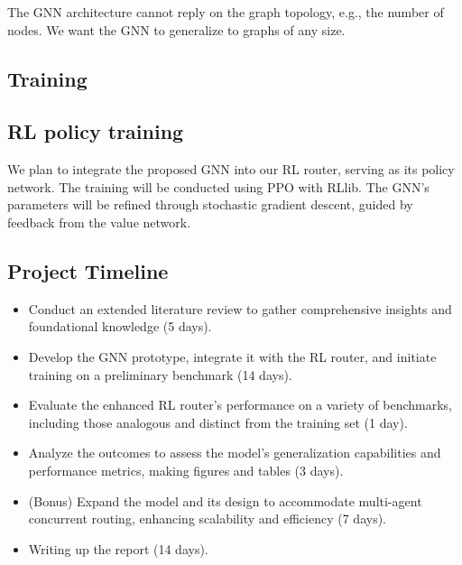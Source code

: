 \documentclass[letterpaper]{article}
\begin{document}
The GNN architecture cannot reply on the graph topology, e.g., the number of nodes. We want the GNN to generalize to graphs of any size. 
\subsection{Training}


\subsection{RL policy training}
We plan to integrate the proposed GNN into our RL router, serving as its policy network. The training will be conducted using PPO with RLlib. The GNN's parameters will be refined through stochastic gradient descent, guided by feedback from the value network.



\subsection{Project Timeline}
\begin{itemize}
    \item Conduct an extended literature review to gather comprehensive insights and foundational knowledge (5 days).
    \item Develop the GNN prototype, integrate it with the RL router, and initiate training on a preliminary benchmark (14 days).
    \item Evaluate the enhanced RL router’s performance on a variety of benchmarks, including those analogous and distinct from the training set (1 day).
    \item Analyze the outcomes to assess the model's generalization capabilities and performance metrics, making figures and tables (3 days).
    \item (Bonus) Expand the model and its design to accommodate multi-agent concurrent routing, enhancing scalability and efficiency (7 days).
    \item Writing up the report (14 days).
\end{itemize}
\end{document}
